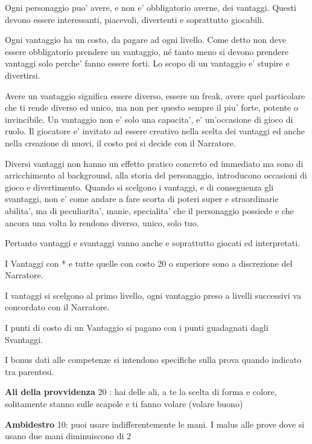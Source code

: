 \documentclass[a4paper,11pt,twoside,openany]{dndbook}
\begin{document}
\bigskip

Ogni personaggio puo' avere, e non e' obbligatorio averne, dei vantaggi. Questi devono essere interessanti, piacevoli, divertenti e soprattutto giocabili.

Ogni vantaggio ha un costo, da pagare ad ogni livello. Come detto non deve essere obbligatorio prendere un vantaggio, né tanto meno si devono prendere vantaggi solo perche' fanno essere forti. Lo scopo di un vantaggio e' stupire e divertirsi. 

Avere un vantaggio significa essere diverso, essere un freak, avere quel particolare che ti rende diverso ed unico, ma non per questo sempre il piu' forte, potente o invincibile. Un vantaggio non e' solo una capacita', e' un'occasione di gioco di ruolo. Il giocatore e' invitato ad essere creativo nella scelta dei vantaggi ed anche nella creazione di nuovi, il costo poi si decide con il Narratore.

Diversi vantaggi non hanno un effetto pratico concreto ed immediato ma sono di arricchimento al background, alla storia del personaggio, introducono occasioni di gioco e divertimento. Quando si scelgono i vantaggi, e di conseguenza gli svantaggi, non e' come andare a fare scorta di poteri super e straordinarie abilita', ma di peculiarita', manie, specialita' che il personaggio possiede e che ancora una volta lo rendono diverso, unico, solo tuo. 

Pertanto vantaggi e svantaggi vanno anche e soprattutto giocati ed interpretati.

I Vantaggi con {*} e tutte quelle con costo 20 o superiore sono a discrezione del Narratore.

I vantaggi si scelgono al primo livello, ogni vantaggio preso a livelli successivi va concordato con il Narratore.

I punti di costo di un Vantaggio si pagano con i punti guadagnati dagli Svantaggi.

I bonus dati alle competenze si intendono specifiche sulla prova quando indicato tra parentesi.

\bigskip

\textbf{Ali della provvidenza} 20 : hai delle ali, a te la scelta di forma e colore, solitamente stanno sulle scapole e ti fanno volare (volare buono)

\textbf{Ambidestro}\label{Ambidestro} 10: puoi usare indifferentemente le mani. I malus alle prove dove si usano due mani diminuiscono di 2
\end{document}
